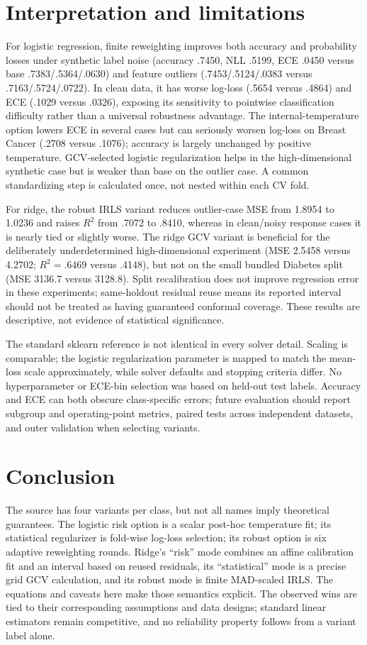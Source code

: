 \documentclass[conference]{IEEEtran}
\begin{document}
\section{Interpretation and limitations}
For logistic regression, finite reweighting improves both accuracy and probability losses under synthetic label noise (accuracy .7450, NLL .5199, ECE .0450 versus base .7383/.5364/.0630) and feature outliers (.7453/.5124/.0383 versus .7163/.5724/.0722). In clean data, it has worse log-loss (.5654 versus .4864) and ECE (.1029 versus .0326), exposing its sensitivity to pointwise classification difficulty rather than a universal robustness advantage. The internal-temperature option lowers ECE in several cases but can seriously worsen log-loss on Breast Cancer (.2708 versus .1076); accuracy is largely unchanged by positive temperature. GCV-selected logistic regularization helps in the high-dimensional synthetic case but is weaker than base on the outlier case. A common standardizing step is calculated once, not nested within each CV fold.

For ridge, the robust IRLS variant reduces outlier-case MSE from 1.8954 to 1.0236 and raises \(R^2\) from .7072 to .8410, whereas in clean/noisy response cases it is nearly tied or slightly worse. The ridge GCV variant is beneficial for the deliberately underdetermined high-dimensional experiment (MSE 2.5458 versus 4.2702; \(R^2=.6469\) versus .4148), but not on the small bundled Diabetes split (MSE 3136.7 versus 3128.8). Split recalibration does not improve regression error in these experiments; same-holdout residual reuse means its reported interval should not be treated as having guaranteed conformal coverage. These results are descriptive, not evidence of statistical significance.

The standard sklearn reference is not identical in every solver detail. Scaling is comparable; the logistic regularization parameter is mapped to match the mean-loss scale approximately, while solver defaults and stopping criteria differ. No hyperparameter or ECE-bin selection was based on held-out test labels. Accuracy and ECE can both obscure class-specific errors; future evaluation should report subgroup and operating-point metrics, paired tests across independent datasets, and outer validation when selecting variants.

\section{Conclusion}
The source has four variants per class, but not all names imply theoretical guarantees. The logistic risk option is a scalar post-hoc temperature fit; its statistical regularizer is fold-wise log-loss selection; its robust option is six adaptive reweighting rounds. Ridge's ``risk'' mode combines an affine calibration fit and an interval based on reused residuals, its ``statistical'' mode is a precise grid GCV calculation, and its robust mode is finite MAD-scaled IRLS. The equations and caveats here make those semantics explicit. The observed wins are tied to their corresponding assumptions and data designs; standard linear estimators remain competitive, and no reliability property follows from a variant label alone.
\end{document}
